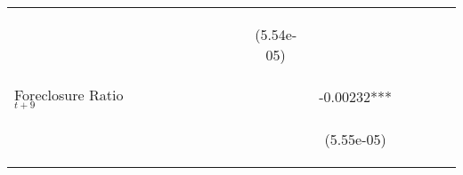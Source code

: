 \begin{table}
\begin{center}
{\begin{tabular}{lccccccccccccc}
\vspace{4pt}  & \begin{footnotesize}\end{footnotesize} & \begin{footnotesize}\end{footnotesize} & \begin{footnotesize}\end{footnotesize} & \begin{footnotesize}\end{footnotesize} & \begin{footnotesize}\end{footnotesize} & \begin{footnotesize}\end{footnotesize} & \begin{footnotesize}\end{footnotesize} & \begin{footnotesize}(5.54e-05)\end{footnotesize} & \begin{footnotesize}\end{footnotesize} & \begin{footnotesize}\end{footnotesize} & \begin{footnotesize}\end{footnotesize} & \begin{footnotesize}\end{footnotesize} \\
Foreclosure Ratio$_{t+9}$  &    &  &  &  &  &  &  &  & -0.00232*** &  &  &  \\
\vspace{4pt}  & \begin{footnotesize}\end{footnotesize} & \begin{footnotesize}\end{footnotesize} & \begin{footnotesize}\end{footnotesize} & \begin{footnotesize}\end{footnotesize} & \begin{footnotesize}\end{footnotesize} & \begin{footnotesize}\end{footnotesize} & \begin{footnotesize}\end{footnotesize} & \begin{footnotesize}\end{footnotesize} & \begin{footnotesize}(5.55e-05)\end{footnotesize} & \begin{footnotesize}\end{footnotesize} & \begin{footnotesize}\end{footnotesize} & \begin{footnotesize}\end{footnotesize} \\

\end{tabular}}
\end{center}
\end{table}

